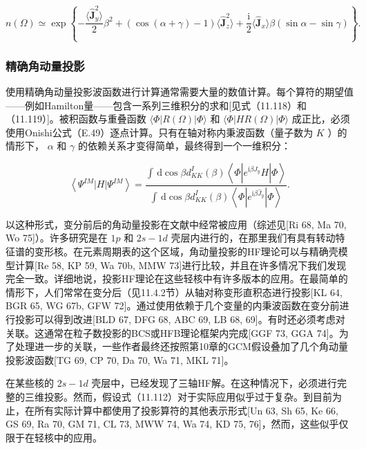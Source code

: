 \[
n(\Omega)\simeq\exp\left\{ -\frac{\langle\hat{\boldsymbol{J}}^{2}_{y}\rangle}{2}\beta^{2}+(\cos(\alpha+\gamma)-1)\langle\hat{\boldsymbol{J}}^{2}_{z}\rangle+\frac{\mathrm{i}}{2}\langle\hat{\boldsymbol{J}}_{x}\rangle\beta(\sin\alpha-\sin\gamma)\right\} .\tag{11.145}
\]


\subsubsection{精确角动量投影}

使用精确角动量投影波函数进行计算通常需要大量的数值计算。每个算符的期望值——例如Hamilton量——包含一系列三维积分的求和{[}见式（11.118）和（11.119）{]}。被积函数与重叠函数
$\langle\Phi\left|{R\left(\Omega\right)}\right|\Phi\rangle$ 和 $\langle\Phi\left|{{HR}\left(\Omega\right)}\right|\Phi\rangle$
成正比，必须使用Onishi公式（E.49）逐点计算。只有在轴对称内秉波函数（量子数为 $K$ ）的情形下， $\alpha$
和 $\gamma$ 的依赖关系才变得简单，最终得到一个一维积分：

\[
\left\langle {{\Psi}^{IM}\left|H\right|{\Psi}^{IM}}\right\rangle =\frac{\int\,\mathrm{d}\cos\beta{d}^{I}_{KK}\left(\beta\right)\left\langle {\Phi\left|{{e}^{{\mathrm{i}\beta}{\widehat{J}}_{y}}H}\right|\Phi}\right\rangle }{\int\,\mathrm{d}\cos\beta{d}^{I}_{KK}\left(\beta\right)\left\langle {\Phi\left|{e}^{{\mathrm{i}\beta}{\widehat{J}}_{y}}\right|\Phi}\right\rangle }.
\]

以这种形式，变分前后的角动量投影在文献中经常被应用（综述见{[}Ri 68, Ma 70, Wo 75{]}）。许多研究是在 ${1p}$
和 ${2s}-{1d}$ 壳层内进行的，在那里我们有具有转动特征谱的变形核\cite{BBC72}。在元素周期表的这个区域，角动量投影的HF理论可以与精确壳模型计算{[}Re
58, KP 59, Wa 70b, MMW 73{]}进行比较，并且在许多情况下我们发现完全一致。详细地说，投影HF理论在这些轻核中有许多版本的应用。在最简单的情形下，人们常常在变分后（见11.4.2节）从轴对称变形直积态进行投影{[}KL
64, BGR 65, WG 67b, GFW 72{]}。通过使用依赖于几个变量的内秉波函数在变分前进行投影可以得到改进{[}BLD
67, DFG 68, ABC 69, LB 68, 69{]}。有时还必须考虑对关联。这通常在粒子数投影的BCS或HFB理论框架内完成{[}GGF
73, GGA 74{]}。为了处理进一步的关联，一些作者最终还按照第10章的GCM假设叠加了几个角动量投影波函数{[}TG 69,
CP 70, Da 70, Wa 71, MKL 71{]}。

在某些核的 ${2s}-{1d}$ 壳层中，已经发现了三轴HF解。在这种情况下，必须进行完整的三维投影。然而，假设式（11.112）对于实际应用似乎过于复杂。到目前为止，在所有实际计算中都使用了投影算符的其他表示形式{[}Un
63, Sh 65, Ke 66, GS 69, Ra 70, GM 71, CL 73, MWW 74, Wa 74, KD 75,
76{]}，然而，这些似乎仅限于在轻核中的应用。

